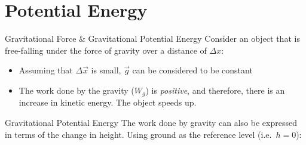 \documentclass[12pt,compress,aspectratio=169]{beamer}
\begin{document}
\section{Potential Energy}

\begin{frame}{Gravitational Force \& Gravitational Potential Energy}
  Consider an object that is free-falling under the force of gravity over a
  distance of $\Delta x$:
  \begin{center}
  \end{center}
  \begin{itemize}
  \item Assuming that $\Delta\vec x$ is small, $\vec g$ can be considered to be
    constant
  \item The work done by the gravity ($W_g$) is \emph{positive}, and
    therefore, there is an increase in kinetic energy. The object speeds up.

  \end{itemize}
\end{frame}



\begin{frame}{Gravitational Potential Energy}
  The work done by gravity can also be expressed in terms of the change in
  height. Using ground as the reference level (i.e.\ $h=0$):
  \begin{center}
  \end{center} 

  \vspace{-.3in}{\Large
    \begin{align*}
      W_g
      &= mg(h_1-h_2)\\
      &= -mg(h_2-h_1)=-(mgh_2-mgh_1) = -\Delta U_g
    \end{align*}
  }


\end{frame}
\end{document}
